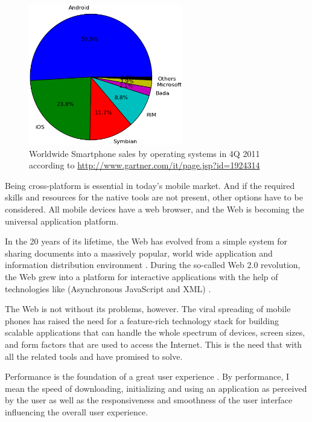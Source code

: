 \begin{figure}[h!]
  \begin{center}
    \includegraphics[width=0.6\textwidth]{images/market-share.png}
    \caption{Worldwide Smartphone sales by operating systems in 4Q
      2011 according to
      \url{http://www.gartner.com/it/page.jsp?id=1924314}}
    \label{figure:market-share.png}
  \end{center}
\end{figure}

Being cross-platform is essential in today's mobile market. And if the
required skills and resources for the native tools are not present,
other options have to be considered. All mobile devices have a web
browser, and the Web is becoming the universal application
platform. \cite{taivalsaari2011web, mikkonen2011apps}

In the 20 years of its lifetime, the Web has evolved from a simple
system for sharing documents into a massively popular, world wide
application and information distribution environment
\cite{taivalsaari2011web}. During the so-called Web 2.0 revolution,
the Web grew into a platform for interactive applications with the
help of technologies like  (Asynchronous JavaScript and
XML) \cite{garrett2005ajax}.

The Web is not without its problems, however. The viral spreading of
mobile phones has raised the need for a feature-rich technology stack
for building scalable applications that can handle the whole spectrum
of devices, screen sizes, and form factors that are used to access the
Internet. This is the need that  with all the related
tools and  have promised to solve.

Performance is the foundation of a great user experience
\cite{charland2011mobile}. By performance, I mean the speed of
downloading, initializing and using an application as perceived by the
user as well as the responsiveness and smoothness of the user
interface influencing the overall user experience.

